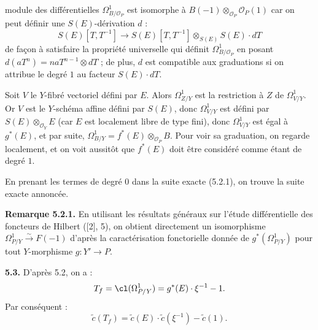module des différentielles \(\Omega^1_{B/\mathcal O_P}\) est isomorphe à \(B(-1)\otimes_{\mathcal O_P}\mathcal O_P(1)\) car on peut définir une \(S(E)\)-dérivation \(d\) :
\[
S(E)[T,T^{-1}]
\longrightarrow
S(E)[T,T^{-1}]\otimes_{S(E)}S(E)\cdot dT
\]
de façon à satisfaire la propriété universelle qui définit \(\Omega^1_{B/\mathcal O_P}\) en posant \(d(aT^n)=naT^{n-1}\otimes dT\) ; de plus, \(d\) est compatible aux graduations si on attribue le degré \(1\) au facteur \(S(E)\cdot dT\).

Soit \(V\) le \(Y\)-fibré vectoriel défini par \(E\). Alors \(\Omega^1_{Z/Y}\) est la restriction à \(Z\) de \(\Omega^1_{V/Y}\). Or \(V\) est le \(Y\)-schéma affine défini par \(S(E)\), donc \(\Omega^1_{V/Y}\) est défini par \(S(E)\otimes_{\mathcal O_Y}E\) (car \(E\) est localement libre de type fini), donc \(\Omega^1_{V/Y}\) est égal à \(g^*(E)\), et par suite, \(\Omega^1_{B/Y}=f^*(E)\otimes_{\mathcal O_P}B\). Pour voir sa graduation, on regarde localement, et on voit aussitôt que \(f^*(E)\) doit être considéré comme étant de degré \(1\).

En prenant les termes de degré \(0\) dans la suite exacte (5.2.1), on trouve la suite exacte annoncée.

\textbf{Remarque 5.2.1.} En utilisant les résultats généraux sur l'étude différentielle des foncteurs de Hilbert ([2], 5), on obtient directement un isomorphisme \(\Omega^1_{P/Y}\xrightarrow{\sim}F(-1)\) d'après la caractérisation fonctorielle donnée de \(g^*(\Omega^1_{P/Y})\) pour tout \(Y\)-morphisme \(g:Y'\to P\).

\textbf{5.3.} D'après 5.2, on a :
\[
 T_f=\cl(\Omega^1_{P/Y})=g^*(E)\cdot\xi^{-1}-1.
\]
Par conséquent :
\[
 \widetilde c(T_f)=\widetilde c(E)\cdot\widetilde c(\xi^{-1})-\widetilde c(1).
\]

